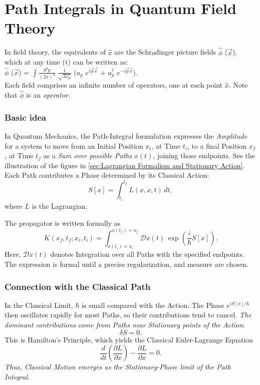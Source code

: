 \documentclass[a4paper, 10pt, onepage]{elegantbook}
\begin{document}
\chapter{Path Integrals in Quantum Field Theory}

In field theory, the equivalents of $\hat{x}$ are the Schr$\ddot{o}$dinger picture fields $\hat{\phi}$ ($\vec{x}$), which at any time (t) can be written as:  \\

$\hat{\phi}$ ($\vec{x}$) = $\int \frac{d^3 p}{(2 \pi)^3}$ $\frac{1}{\sqrt{2 \omega_p}}$ ($a_p$ $e^{i \vec{p} \vec{x}}$ + $a^{\dagger}_p$ $e^{-i \vec{p} \vec{x}}$).  \\

Each field comprises an infinite number of operators, one at each point $\hat{x}$. Note that $\hat{\phi}$ is an \emph{operator}.

\subsection{Basic idea}

In Quantum Mechanics, the Path-Integral formulation expresses the \emph{Amplitude} for a system to move from an Initial Position \(x_i\), at Time \(t_i\), to a final Position \(x_f\), at Time \(t_f\) as a \emph{Sum over possible Paths} \(x(t)\), joining those endpoints. See the illustration of the figure in \ref{sec:Lagrangian Formalism and Stationary Action}. Each Path contributes a Phase determined by its Classical Action:
\[
S[x]=\int_{t_i}^{t_f} L(x,\dot{x},t)\,dt,
\]
where \(L\) is the Lagrangian.

The propagator is written formally as
\[
\boxed{
K(x_f,t_f;x_i,t_i)
=
\int_{x(t_i)=x_i}^{x(t_f)=x_f}
\mathcal{D}x(t)\,
\exp\!\left(\frac{i}{\hbar}S[x]\right)
}.
\]
Here, \(\mathcal{D}x(t)\) denotes Integration over all Paths with the specified endpoints. The expression is formal until a precise
regularization, and measure are chosen.

\subsection{Connection with the Classical Path}
\label{ssec:Connection with the Classical Path}

In the Classical Limit, \(\hbar\) is small compared with the Action. The Phase \(e^{iS[x]/\hbar}\) then oscillates rapidly for most Paths, so their contributions tend to cancel. \emph{The dominant contributions come from Paths near Stationary points of the Action}:
\[
\delta S=0.
\]
This is Hamilton's Principle, which yields the Classical Euler-Lagrange Equation
\[
\frac{d}{dt}\left(\frac{\partial L}{\partial\dot{x}}\right)
-\frac{\partial L}{\partial x}=0.
\]
\emph{Thus, Classical Motion emerges as the Stationary-Phase limit of the
Path Integral}.
\end{document}
